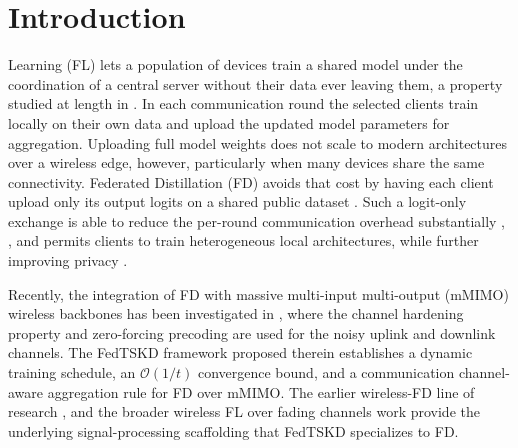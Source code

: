 \documentclass[journal]{IEEEtran}
\newcommand{\rev}[1]{#1}
\begin{document}
{\renewcommand{\abstractname}{Impact Statement}
\begin{abstract}
\rev{Wireless networks are beginning to train shared artificial intelligence models across phones, wearables and vehicles without gathering anyone's data centrally. Only a handful of devices can be served in each training round. Picking them at random means some devices contribute many times more than others, so whose data shapes the resulting model becomes partly a matter of chance. This work replaces that lottery with a rotation whose fairness follows from three quantities a network operator already knows, and which can therefore be stated before a deployment is switched on rather than measured after it has run. Operators give up no accuracy in exchange. As artificial intelligence systems come under growing legal obligation to evidence equitable treatment of the people they serve, the ability to commit to a participation guarantee in advance, rather than report one in hindsight, changes what such a deployment can promise both its users and its regulators.}
\end{abstract}}
\vspace{-1em}
\section{Introduction}
\label{sec:introduction}
 Learning (FL) \cite{borazjani2026redefining} lets a population of devices train a shared model under the coordination of a central server without their data ever leaving them, a property studied at length in \cite{rao2025privacy, lim2020federated, huang2024survey, lu2024noniid}. In each communication round the selected clients train locally on their own data and upload the updated model parameters for aggregation. Uploading full model weights does not scale to modern architectures over a wireless edge, however, particularly when many devices share the same connectivity. Federated Distillation (FD) \cite{xing2022efficient} avoids that cost by having each client upload only its output logits on a shared public dataset \cite{itahara2023distillation}. Such a logit-only exchange is able to reduce the per-round communication overhead substantially \cite{sattler2022cfd}, \cite{sattler2023fedaux}, and permits clients to train heterogeneous local architectures, while further improving privacy \cite{chan2021fedhe, cho2023clustered, wu2024fedict}.

Recently, the integration of FD with massive multi-input multi-output (mMIMO) wireless backbones has been investigated in \cite{mu2024fedtskd}, where the channel hardening property and zero-forcing precoding are used for the noisy uplink and downlink channels. The FedTSKD framework proposed therein establishes a dynamic training schedule, an $\mathcal{O}(1/t)$ convergence bound, and a communication channel-aware aggregation rule for FD over mMIMO. The earlier wireless-FD line of research \cite{ahn2019wireless}, \cite{ahn2020cooperative} and the broader wireless FL over fading channels work \cite{amiri2020federated, amiri2020machine, vu2020cell, amiri2021convergence} provide the underlying signal-processing scaffolding that FedTSKD specializes to FD.
\end{document}
